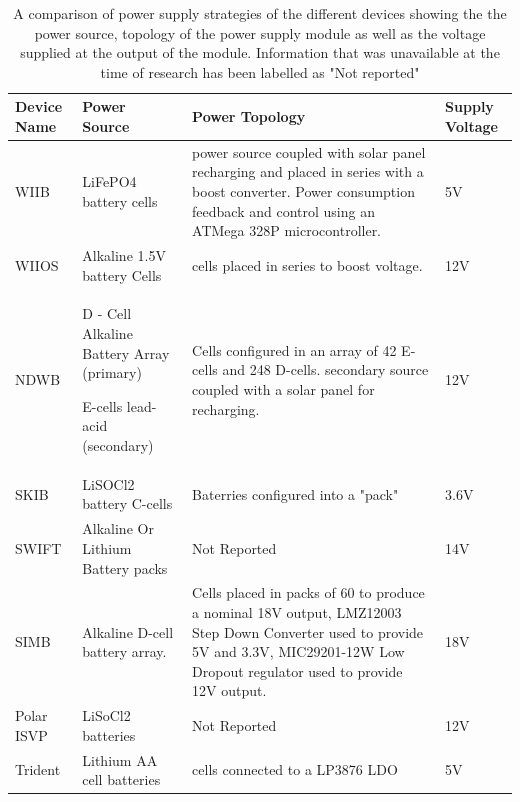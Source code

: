 \begin{table}[H]
    \centering
    \caption{A comparison of power supply strategies of the different devices  showing the the power source, topology of the power supply module as well as the voltage supplied at the output of the module. Information that was unavailable at the time of research has been labelled as "Not reported"}
    \label{tab:device_power_source}
    \begin{tabular}{|>{\centering}m{}|>{\RaggedRight}m{}|>{\RaggedRight}m{}|>{\Centering}m{}|}
    \hline
    \textbf{Device Name}& \textbf{Power Source} & \textbf{Power Topology} & \textbf{Supply Voltage}  \\
    \hline
    WIIB & LiFePO4 battery cells & power source coupled with solar panel recharging and placed in series with a boost converter. Power consumption feedback and control using an ATMega 328P microcontroller.\footnotemark & 5V\\
    \hline    
    WIIOS & Alkaline 1.5V battery Cells & 8 cells placed in series to boost voltage. & 12V\\
    \hline
    NDWB & D - Cell Alkaline Battery Array (primary) \par E-cells lead-acid (secondary) & Cells configured in an array of 42 E-cells and 248 D-cells. secondary source coupled with a solar panel for recharging. & 12V\\
    \hline
    SKIB & LiSOCl2 battery C-cells & Baterries configured into a "pack" & 3.6V\\
    \hline
    SWIFT & Alkaline Or Lithium Battery packs & Not Reported &  14V\\
    \hline
    SIMB & Alkaline D-cell battery array.& Cells placed in packs of 60 to produce a nominal 18V output, LMZ12003 Step Down Converter used to provide 5V and 3.3V, MIC29201-12W Low Dropout regulator used to provide 12V output. & 18V\\
    \hline
    Polar ISVP & LiSoCl2 batteries & Not Reported & 12V\\
    \hline
    Trident & Lithium AA cell batteries & 4 cells connected to a LP3876 LDO & 5V \\
    \hline
    \end{tabular}
\end{table}
\newpage
{}

